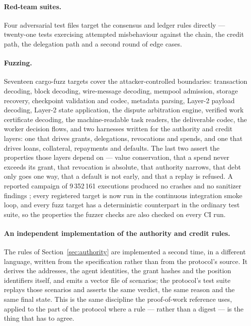 \documentclass{article}
\begin{document}
\paragraph{Red-team suites.} Four adversarial test files target the consensus
and ledger rules directly --- twenty-one tests exercising attempted
misbehaviour against the chain, the credit path, the delegation path and a
second round of edge cases.

\paragraph{Fuzzing.} Seventeen cargo-fuzz targets cover the attacker-controlled
boundaries: transaction decoding, block decoding, wire-message decoding,
mempool admission, storage recovery, checkpoint validation and codec, metadata
parsing, Layer-2 payload decoding, Layer-2 state application, the dispute
arbitration engine, verified work certificate decoding, the machine-readable
task readers, the deliverable codec, the worker decision flows, and two
harnesses written for the authority and credit layers: one that drives grants,
delegations, revocations and spends, and one that drives loans, collateral,
repayments and defaults. The last two assert the properties those layers
depend on --- value conservation, that a spend never exceeds its grant, that
revocation is absolute, that authority narrows, that debt only goes one way,
that a default is not early, and that a replay is refused. A reported campaign
of 9\,352\,161
executions produced no crashes and no sanitizer findings
\cite{srct-fuzz}; every registered target is now run in the continuous
integration smoke loop, and every fuzz target has a deterministic counterpart in
the ordinary test suite, so the properties the fuzzer checks are also checked on
every CI run.

\paragraph{An independent implementation of the authority and credit rules.}
The rules of Section~\ref{sec:authority} are implemented a second time, in a
different language, written from the specification rather than from the
protocol's source. It derives the addresses, the agent identities, the grant
hashes and the position identifiers itself, and emits a vector file of
scenarios; the protocol's test suite replays those scenarios and asserts the
same verdict, the same reason and the same final state. This is the same
discipline the proof-of-work reference uses, applied to the part of the
protocol where a rule --- rather than a digest --- is the thing that has to
agree.
\end{document}
